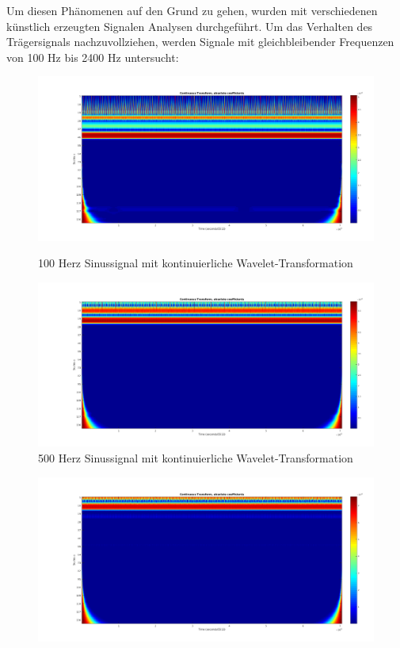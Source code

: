\begin{refsection}
Um diesen Phänomenen auf den Grund zu gehen, wurden mit verschiedenen künstlich erzeugten Signalen Analysen durchgeführt.
Um das Verhalten des Trägersignals nachzuvollziehen, werden Signale mit gleichbleibender Frequenzen von 100 Hz bis 2400 Hz untersucht:
\begin{figure}[h]
	\centering
	\includegraphics[width=0.9\linewidth]{papers/meteor/images/anomalie/beam/cwt_0100hz.png}
	\caption{100 Herz Sinussignal mit kontinuierliche Wavelet-Transformation}
	\includegraphics[width=0.9\linewidth]{papers/meteor/images/anomalie/beam/cwt_0500hz.png}
	\caption{500 Herz Sinussignal mit kontinuierliche Wavelet-Transformation}
	\label{fig:cwt_anomalie_beam_1}
\end{figure}
\newpage
\begin{figure}[h]
	\centering
	\includegraphics[width=0.9\linewidth]{papers/meteor/images/anomalie/beam/cwt_1000hz.png}

\end{figure}
\end{refsection}
